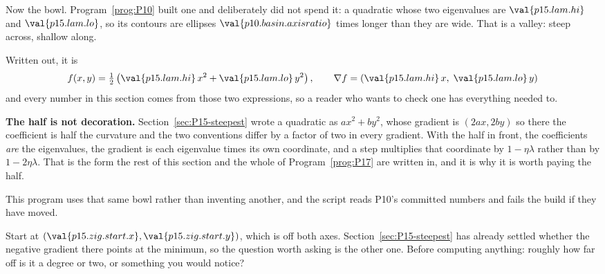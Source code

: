 \begin{fr}
Now the bowl. Program~\ref{prog:P10} built one and deliberately did not spend
it: a quadratic whose two eigenvalues are $\val{p15.lam.hi}$ and
$\val{p15.lam.lo}$, so its contours are ellipses
$\val{p10.basin.axisratio}$ times longer than they are wide. That is a
valley: steep across, shallow along.

Written out, it is
\[ f(x, y) = \tfrac{1}{2}\left(\val{p15.lam.hi}\,x^{2}
   + \val{p15.lam.lo}\,y^{2}\right),
   \qquad
   \nabla f = (\val{p15.lam.hi}\,x,\; \val{p15.lam.lo}\,y) \]
and every number in this section comes from those two expressions, so a reader
who wants to check one has everything needed to.

\textbf{The half is not decoration.} Section~\ref{sec:P15-steepest} wrote a
quadratic as $ax^{2} + by^{2}$, whose gradient is $(2ax, 2by)$ \dash{} so
there the coefficient is half the curvature and the two conventions differ by
a factor of two in every gradient. With the half in front, the coefficients
\emph{are} the eigenvalues, the gradient is each eigenvalue times its own
coordinate, and a step multiplies that coordinate by $1 - \eta\lambda$ rather
than by $1 - 2\eta\lambda$. That is the form the rest of this section and the
whole of Program~\ref{prog:P17} are written in, and it is why it is worth
paying the half.

This program uses that same bowl rather than inventing another, and the script
reads P10's committed numbers and fails the build if they have moved.

Start at $(\val{p15.zig.start.x}, \val{p15.zig.start.y})$, which is off both
axes. Section~\ref{sec:P15-steepest} has already settled whether the negative
gradient there points at the minimum, so the question worth asking is the
other one. Before computing anything: roughly how far off is it \dash{} a
degree or two, or something you would notice?
\nextframe
\end{fr}

